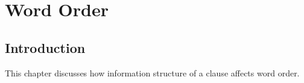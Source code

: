 \chapter{Word Order}\label{WordOrder}






%





\section{Introduction}\label{WO:Intro}

This chapter discusses how information structure of a clause affects
word order.

